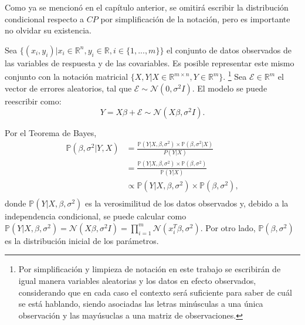 Como ya se mencion\'o en el cap\'itulo anterior, se omitir\'a escribir la distribuci\'on condicional respecto a $CP$ por simplificaci\'on de la notaci\'on, pero es importante no olvidar su existencia.

Sea $\{(x_i,y_i)| x_i \in \mathbb{R}^n, y_i \in \mathbb{R}, i \in \{1,...,m\} \}$ el conjunto de datos observados de las variables de respuesta y de las covariables. Es posible representar este mismo conjunto con la notaci\'on matricial $\{X,Y | X \in \mathbb{R}^{m \times n}, Y \in \mathbb{R}^m\}$. \footnote{Por simplificaci\'on y limpieza de notaci\'on en este trabajo se escribir\'an de igual manera variables aleatorias y los datos en efecto observados, considerando que en cada caso el contexto ser\'a suficiente para saber de cu\'al se est\'a hablando, siendo asociadas las letras min\'usculas a una \'unica observaci\'on y las may\'usuclas a una matriz de observaciones.} Sea $\mathcal{E} \in \mathbb{R}^m$ el vector de errores aleatorios, tal que $\mathcal{E} \sim \mathcal{N}(0,\sigma^2 I)$. El modelo se puede reescribir como:
\begin{equation*}
    Y = X\beta + \mathcal{E} \sim \mathcal{N}(X\beta,\sigma^2 I).
\end{equation*}

Por el Teorema de Bayes,
\begin{equation*}
\begin{aligned}
    \mathbb{P}(\beta,\sigma^2 | Y, X) 
    &= \frac{\mathbb{P}(Y| X, \beta, \sigma^2) \times \mathbb{P}(\beta, \sigma^2 | X)}{P(Y | X)} \\
    &= \frac{\mathbb{P}(Y| X, \beta, \sigma^2) \times \mathbb{P}(\beta, \sigma^2)}{\mathbb{P}(Y | X)} \\
    &\propto \mathbb{P}(Y| X, \beta, \sigma^2) \times \mathbb{P}(\beta, \sigma^2), \\
\end{aligned}
\end{equation*}
donde $\mathbb{P}(Y| X, \beta, \sigma^2)$ es la verosimilitud de los datos observados y, debido a la independencia condicional, se puede calcular como $\mathbb{P}(Y| X, \beta, \sigma^2) = \mathcal{N}(X\beta,\sigma^2 I) = \prod_{i=1}^m \mathcal{N}(x_i^T\beta,\sigma^2)$. Por otro lado, $\mathbb{P}(\beta,\sigma^2)$ es la distribuci\'on inicial de los par\'ametros.

